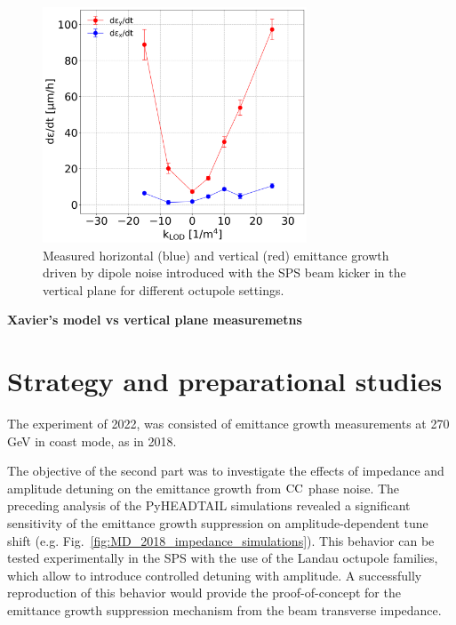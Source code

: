 \begin{figure}[!h]
   \centering         
   \includegraphics[width=0.7\textwidth]{images/Ch8/emitGrowth_H_V_dipole_noise_damper_md_measurements.png}
       \caption{Measured horizontal (blue) and vertical (red) emittance growth driven by dipole noise introduced with the SPS beam kicker in the vertical plane for different octupole settings.}
       \label{fig:coast_dipole_noise_damper_md_2022_measurement}
\end{figure}

\textbf{Xavier's model vs vertical plane measuremetns}\\

\newpage

\section{Strategy and preparational studies}\label{sec:strategy_md_2022}
The experiment of 2022, was consisted of emittance growth measurements at 270\,GeV in coast mode, as in 2018. 

The objective of the second part was to investigate the effects of impedance and amplitude detuning on the emittance growth from ${\mathrm{CC}}$ phase noise. The preceding analysis of the PyHEADTAIL simulations revealed a significant sensitivity of the emittance growth suppression on amplitude-dependent tune shift (e.g. Fig.~\ref{fig:MD_2018_impedance_simulations}). This behavior can be tested experimentally in the SPS with the use of the Landau octupole families, which allow to introduce controlled detuning with amplitude. A successfully reproduction of this behavior would provide the proof-of-concept for the emittance growth suppression mechanism from the beam transverse impedance.




